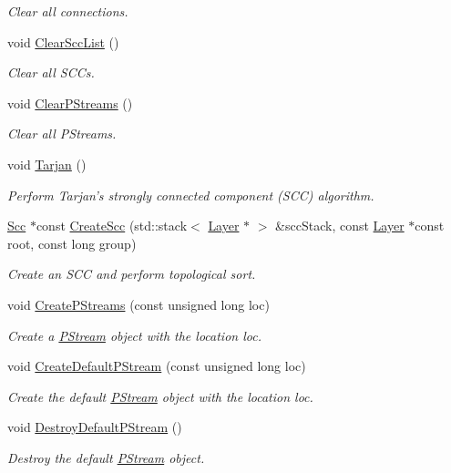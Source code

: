 \begin{DoxyCompactItemize}
\begin{DoxyCompactList}\small\item\em Clear all connections. \end{DoxyCompactList}\item 
void \hyperlink{classfractal_1_1Rnn_a6bb983dfd300fc9d906ed05bc481d2e8}{Clear\+Scc\+List} ()
\begin{DoxyCompactList}\small\item\em Clear all S\+C\+Cs. \end{DoxyCompactList}\item 
void \hyperlink{classfractal_1_1Rnn_a1a94073d8b65fbb0d9a1fa262f60bc3f}{Clear\+P\+Streams} ()
\begin{DoxyCompactList}\small\item\em Clear all P\+Streams. \end{DoxyCompactList}\item 
void \hyperlink{classfractal_1_1Rnn_aff5d760fe57f949ad69a913757deb874}{Tarjan} ()
\begin{DoxyCompactList}\small\item\em Perform Tarjan's strongly connected component (S\+C\+C) algorithm. \end{DoxyCompactList}\item 
\hyperlink{classfractal_1_1Rnn_aea69a9549eee7a4de8163e2bc6be19a1}{Scc} $\ast$const \hyperlink{classfractal_1_1Rnn_a76287a6b58925f1a7b40ace3ed261e9f}{Create\+Scc} (std\+::stack$<$ \hyperlink{classfractal_1_1Layer}{Layer} $\ast$ $>$ \&scc\+Stack, const \hyperlink{classfractal_1_1Layer}{Layer} $\ast$const root, const long group)
\begin{DoxyCompactList}\small\item\em Create an S\+C\+C and perform topological sort. \end{DoxyCompactList}\item 
void \hyperlink{classfractal_1_1Rnn_adaf84bde48406ad0c51bfbba084c5516}{Create\+P\+Streams} (const unsigned long loc)
\begin{DoxyCompactList}\small\item\em Create a \hyperlink{classfractal_1_1PStream}{P\+Stream} object with the location {\itshape loc}. \end{DoxyCompactList}\item 
void \hyperlink{classfractal_1_1Rnn_a3644eda8587be1557f9a3432bc6f4665}{Create\+Default\+P\+Stream} (const unsigned long loc)
\begin{DoxyCompactList}\small\item\em Create the default \hyperlink{classfractal_1_1PStream}{P\+Stream} object with the location {\itshape loc}. \end{DoxyCompactList}\item 
void \hyperlink{classfractal_1_1Rnn_a7e1b6fb3ff4b5cb2de93f19ce94b709d}{Destroy\+Default\+P\+Stream} ()
\begin{DoxyCompactList}\small\item\em Destroy the default \hyperlink{classfractal_1_1PStream}{P\+Stream} object. \end{DoxyCompactList}\end{DoxyCompactItemize}
